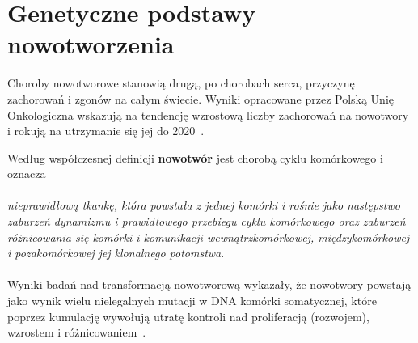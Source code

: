 \section{Genetyczne podstawy nowotworzenia}\label{cha:gen}
Choroby nowotworowe stanowią drugą, po chorobach serca, przyczynę zachorowań i zgonów na całym świecie. Wyniki opracowane przez Polską Unię Onkologiczna wskazują na tendencję wzrostową liczby zachorowań na nowotwory i rokują na utrzymanie się jej do 2020~\cite{zikula}.

Według współczesnej definicji \textbf{nowotwór} jest chorobą cyklu komórkowego i oznacza \cite{zikula2} \\ \ \\ \textit{nieprawidłową tkankę, która powstała z jednej komórki i rośnie jako następstwo zaburzeń dynamizmu i prawidłowego przebiegu cyklu komórkowego oraz zaburzeń różnicowania się komórki i komunikacji wewnątrzkomórkowej, międzykomórkowej i pozakomórkowej jej klonalnego potomstwa}. \\ \ \\
Wyniki badań nad transformacją nowotworową wykazały, że nowotwory powstają jako wynik wielu nielegalnych mutacji w DNA komórki somatycznej, które poprzez kumulację wywołują utratę kontroli nad proliferacją (rozwojem), wzrostem i różnicowaniem~\cite{zikula5}.

